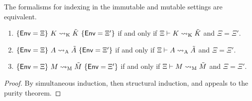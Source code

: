 \begin{theorem}[Equivalence]
The formalisms for indexing in the immutable and mutable settings are equivalent.
\begin{enumerate}
\item $\{\mathsf{Env} = \Xi\}\ K \rightsquigarrow_{{\normalfont\text{K}}} \tilde K\ \{\mathsf{Env} = \Xi'\}$ if and only if $\Xi \vdash K \rightsquigarrow_{{\normalfont\text{K}}} \tilde K$ and $\Xi = \Xi'$.
\item $\{\mathsf{Env} = \Xi\}\ A \rightsquigarrow_{{\normalfont\text{A}}} \tilde A\ \{\mathsf{Env} = \Xi'\}$ if and only if $\Xi \vdash A \rightsquigarrow_{{\normalfont\text{A}}} \tilde A$ and $\Xi = \Xi'$.
\item $\{\mathsf{Env} = \Xi\}\ M \rightsquigarrow_{{\normalfont\text{M}}} \tilde M\ \{\mathsf{Env} = \Xi'\}$ if and only if $\Xi \vdash M \rightsquigarrow_{{\normalfont\text{M}}} \tilde M$ and $\Xi = \Xi'$.
\end{enumerate}
\begin{proof}
By simultaneous induction, then structural induction, and appeals to the purity theorem.
\end{proof}
\end{theorem}
